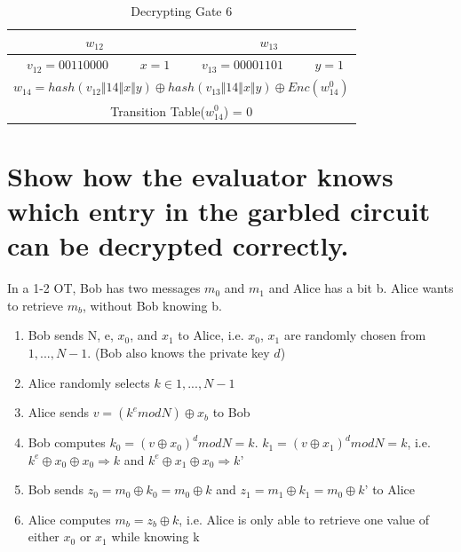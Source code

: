 \documentclass[times]{article}
\begin{document}
	\begin{table}
		\centering
		\caption{Decrypting Gate 6}
		\label{tab:DG6}
		\begin{tabular}{|c|c||c|c|}
			\hline
			\multicolumn{2}{|c||}{$w_{12}$} & \multicolumn{2}{|c|}{$w_{13}$} \\
			\hline
			$v_{12} = 00110000$ & $x = 1$ & $v_{13} = 00001101$ & $y = 1$ \\
			\hline
			\multicolumn{4}{|c||}{$w_{14} = hash(v_{12} \Vert 14 \Vert x \Vert y) \oplus hash(v_{13} \Vert 14 \Vert x \Vert y) \oplus Enc(w_{14}^0)$} \\
			\hline
			\multicolumn{4}{|c||}{Transition Table($w_{14}^0$) = 0} \\
			\hline
		\end{tabular}
	\end{table}
	

	\begin{minipage}{\linewidth}%

	\section{Show how the evaluator knows which entry in the garbled circuit can be decrypted correctly.}
	In a 1-2 OT, Bob has two messages $m_0$ and $m_1$ and Alice has a bit b. Alice wants to retrieve $m_b$, without Bob knowing b.

	\begin{enumerate}
  		\item Bob sends N, e, $x_0$, and $x_1$ to Alice, i.e. $x_0$, $x_1$ are randomly chosen from ${1, ..., N-1}$. (Bob also knows the private key $d$)
  		\item Alice randomly selects $k \in {1,...,N-1}$
  		\item Alice sends $v = (k^e mod N) \oplus x_b$ to Bob
  		\item Bob computes $k_0 = (v \oplus x_0)^d mod N = k$. $k_1 = (v \oplus x_1)^d mod N = k$, i.e. $k^e \oplus x_0 \oplus x_0 \Rightarrow k$ and $k^e \oplus x_1 \oplus x_0 \Rightarrow k’$
  		\item Bob sends  $z_0 = m_0 \oplus k_0 = m_0 \oplus k$ and $z_1 = m_1 \oplus k_1 = m_0 \oplus k’$ to Alice
  		\item Alice computes $m_b = z_b \oplus k$, i.e. Alice is only able to retrieve one value of either $x_0$ or $x_1$ while knowing k

	\end{enumerate}
	\end{minipage}
\end{document}
